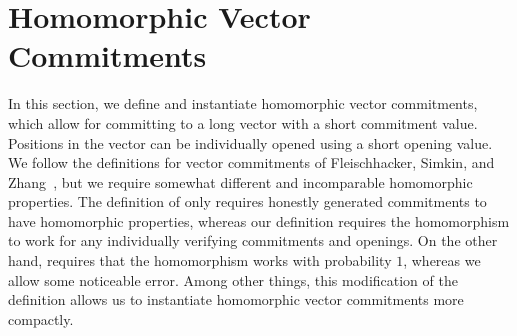 \section{Homomorphic Vector Commitments}\label{sec:veccom}

In this section, we define and instantiate homomorphic vector commitments, which allow for committing to a long vector with a short commitment value.
Positions in the vector can be individually opened using a short opening value.
We follow the definitions for vector commitments of Fleischhacker, Simkin, and Zhang~\cite{CCS:FleSimZha22}, but we require somewhat different and incomparable homomorphic properties.
The definition of \cite{CCS:FleSimZha22} only requires honestly generated commitments to have homomorphic properties, whereas our definition requires the homomorphism to work for any individually verifying commitments and openings.
On the other hand, \cite{CCS:FleSimZha22} requires that the homomorphism works with probability $1$, whereas we allow some noticeable error.
Among other things, this modification of the definition allows us to instantiate homomorphic vector commitments more compactly.



